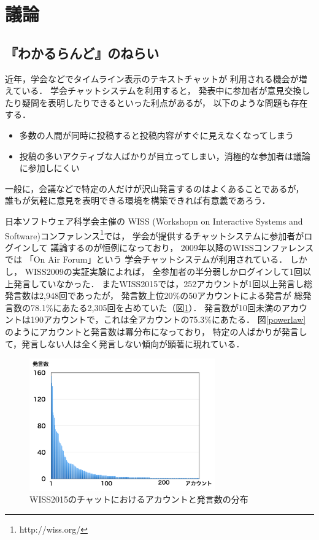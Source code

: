 \section{議論}

\subsection{『わかるらんど』のねらい}

近年，学会などでタイムライン表示のテキストチャットが
利用される機会が増えている\cite{goto2012}．
学会チャットシステムを利用すると，
発表中に参加者が意見交換したり疑問を表明したりできるといった利点があるが，
以下のような問題も存在する．

\begin{itemize}
\item 多数の人間が同時に投稿すると投稿内容がすぐに見えなくなってしまう
\item 投稿の多いアクティブな人ばかりが目立ってしまい，消極的な参加者は議論に参加しにくい
\end{itemize}

一般に，会議などで特定の人だけが沢山発言するのはよくあることであるが，
誰もが気軽に意見を表明できる環境を構築できれば有意義であろう．

日本ソフトウェア科学会主催の
WISS (Workshopn on Interactive Systems and Software)コンファレンス\footnote{
  \textsf{http://wiss.org/}
}では，
学会が提供するチャットシステムに参加者がログインして
議論するのが恒例になっており\cite{wiss_challenge}，
2009年以降のWISSコンファレンスでは
「On Air Forum」\cite{nishida2011}という
学会チャットシステムが利用されている．
%
しかし，
WISS2009の実証実験によれば，
全参加者の半分弱しかログインして1回以上発言していなかった．
またWISS2015では，252アカウントが1回以上発言し総発言数は2,948回であったが，
発言数上位20\%の50アカウントによる発言が
総発言数の78.1\%にあたる2,305回を占めていた（図\ref{wisschat}）．
発言数が10回未満のアカウントは190アカウントで，これは全アカウントの75.3\%にあたる．
図\ref{powerlaw}のようにアカウントと発言数は冪分布になっており，
特定の人ばかりが発言して，発言しない人は全く発言しない傾向が顕著に現れている．

\begin{figure}[h]
\centering\includegraphics[width=8cm]{images/wisschat.png}
\caption{WISS2015のチャットにおけるアカウントと発言数の分布}
\label{wisschat}
\end{figure}

